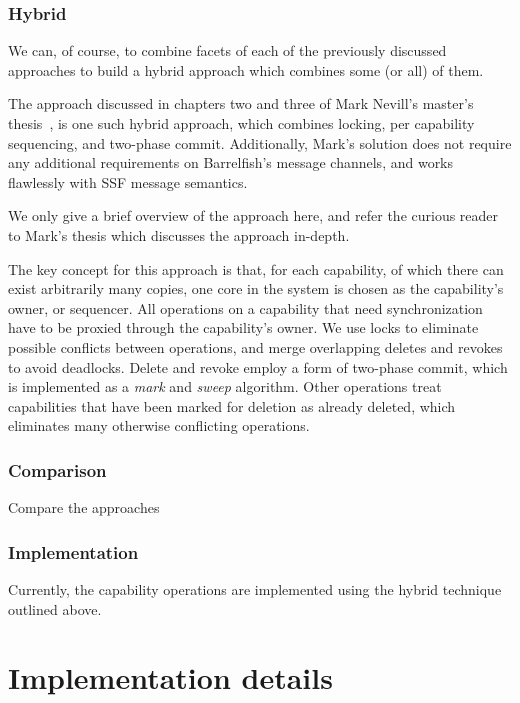 \documentclass[a4paper,twoside]{report} %
\begin{document}
\subsection{Hybrid}

We can, of course, to combine facets of each of the previously discussed
approaches to build a hybrid approach which combines some (or all) of them.

The approach discussed in chapters two and three of Mark Nevill's master's
thesis~\cite{Nevill2012}, is one such hybrid approach, which combines locking,
per capability sequencing, and two-phase commit.
Additionally, Mark's solution does not require any additional requirements on
Barrelfish's message channels, and works flawlessly with SSF message
semantics.

We only give a brief overview of the approach here, and refer the curious
reader to Mark's thesis which discusses the approach in-depth.

The key concept for this approach is that, for each capability, of which there
can exist arbitrarily many copies, one core in the system is chosen as the
capability's owner, or sequencer.
All operations on a capability that need synchronization have to be proxied
through the capability's owner.
We use locks to eliminate possible conflicts between operations, and merge
overlapping deletes and revokes to avoid deadlocks.
Delete and revoke employ a form of two-phase commit, which is implemented as a
\emph{mark} and \emph{sweep} algorithm.
Other operations treat capabilities that have been marked for deletion as
already deleted, which eliminates many otherwise conflicting operations.

\subsection{Comparison}
Compare the approaches

\subsection{Implementation}

Currently, the capability operations are implemented using the hybrid
technique outlined above.


\chapter{Implementation details}\label{chap:implementation}
\end{document}
